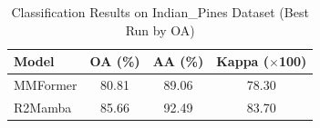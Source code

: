 \begin{table}[htbp]
\centering
\caption{Classification Results on Indian\_Pines Dataset (Best Run by OA)}
\label{tab:indian_pines_results_arranged}
\begin{tabular}{lccc}
\toprule
Model & OA (\%) & AA (\%) & Kappa ($\times$100) \\
\midrule
MMFormer & 80.81 & 89.06 & 78.30 \\
R2Mamba & 85.66 & 92.49 & 83.70 \\
\bottomrule
\end{tabular}
\end{table}